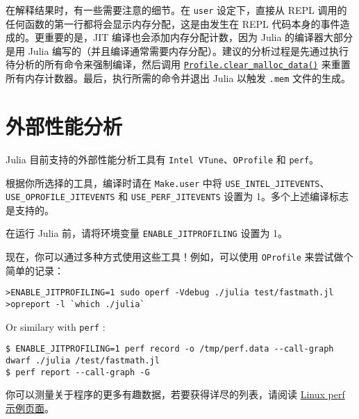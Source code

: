 在解释结果时，有一些需要注意的细节。在 \texttt{user} 设定下，直接从 REPL 调用的任何函数的第一行都将会显示内存分配，这是由发生在 REPL 代码本身的事件造成的。更重要的是，JIT 编译也会添加内存分配计数，因为 Julia 的编译器大部分是用 Julia 编写的（并且编译通常需要内存分配）。建议的分析过程是先通过执行待分析的所有命令来强制编译，然后调用 \hyperlink{12697816172521511938}{\texttt{Profile.clear\_malloc\_data()}} 来重置所有内存计数器。最后，执行所需的命令并退出 Julia 以触发 \texttt{.mem} 文件的生成。



\hypertarget{7694373006850867155}{}


\chapter{外部性能分析}



Julia 目前支持的外部性能分析工具有 \texttt{Intel VTune}、\texttt{OProfile} 和 \texttt{perf}。



根据你所选择的工具，编译时请在 \texttt{Make.user} 中将 \texttt{USE\_INTEL\_JITEVENTS}、\texttt{USE\_OPROFILE\_JITEVENTS} 和 \texttt{USE\_PERF\_JITEVENTS} 设置为 1。多个上述编译标志是支持的。



在运行 Julia 前，请将环境变量 \texttt{ENABLE\_JITPROFILING} 设置为 1。



现在，你可以通过多种方式使用这些工具！例如，可以使用 \texttt{OProfile} 来尝试做个简单的记录：




\begin{lstlisting}
>ENABLE_JITPROFILING=1 sudo operf -Vdebug ./julia test/fastmath.jl
>opreport -l `which ./julia`
\end{lstlisting}



Or similary with \texttt{perf} :




\begin{lstlisting}
$ ENABLE_JITPROFILING=1 perf record -o /tmp/perf.data --call-graph dwarf ./julia /test/fastmath.jl
$ perf report --call-graph -G
\end{lstlisting}



你可以测量关于程序的更多有趣数据，若要获得详尽的列表，请阅读 \href{http://www.brendangregg.com/perf.html}{Linux perf 示例页面}。



